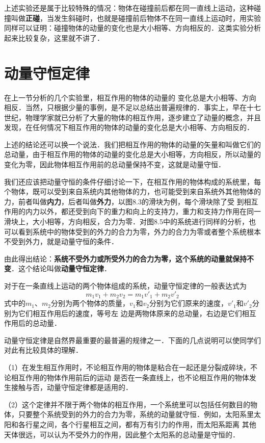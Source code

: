 上述实验还是属于比较特殊的情况：物体在碰撞前后都在同一直线上运动，这种碰撞叫做\textbf{正碰}，当发生斜碰时，也就是碰撞前后物体不在同一直线上运动时，用实验同样可以证明：碰撞物体的动量的变化也是大小相等、方向相反的．这类实验分析起来比较复杂，这里就不讲了．
\newpage
\section{动量守恒定律}
在上一节分析的几个实验里，相互作用的物体的动量的
变化总是大小相等、方向相反．当然，只根据少量的事例，是不足以总结出普遍规律的．事实上，早在十七世纪，物理学家就已分析了大量的物体的相互作用，逐步建立了动量的概念，并且发现，在任何情况下相互作用的物体的动量的变化总是大小相等、方向相反的．

上述的结论还可以换一个说法．我们把相互作用的物体的动量的矢量和叫做它们的总动量，由于相互作用的物体的动量的变化总是大小相等，方向相反，所以动量的变化为零，因此物体相互作用前的总动量保持不变，这就是动量守恒．

我们还应该把动量守恒的条件仔细讨论一下，在相互作用的物体构成的系统里，每个物体，既可以受到来自系统内其他物体的力，也可能受到来自系统外其他物体的力，前者叫做\textbf{内力}，后者叫做\textbf{外力}，以图8.3的滑块为例，每个滑块除了受
到相互作用的内力以外，都还受到向下的重力和向上的支持力，重力和支持力作用在同一滑块上，大小相等，方向相反，合力为零．对图8.5中的系统进行同样的分析，也可以看到系统中的物体受到的外力的合力为零，外力的合力为零或者整个系统根本不受到外力，就是动量守恒的条件．

由此得出结论：\textbf{系统不受外力或所受外力的合力为零，这个系统的动量就保持不变}．这个结论叫做\textbf{动量守恒定律}．

对于在一条直线上运动的两个物体组成的系统，动量守恒定律的一般表达式为
\[m_1v_1+m_2v_2=m_1v'_1+m_2v'_2 \]
式中的$m_1$、$m_2$分别为两个物体的质量，$v_1$和$v_2$分别为它们原来的速度，$v'_1$和$v'_2$分别为它们相互作用后的速度，等号左
边是两物体原来的总动量，右边是它们相互作用后的总动量．

动量守恒定律是自然界最重要的最普遍的规律之一．下面的几点说明可以使同学们对此有比较具体的理解．

（1）在发生相互作用时，不论相互作用的物体是粘合在一起还是分裂成碎块，不论相互作用的物体作用前后的运动
是否在一条直线上，也不论相互作用的物体发生接触与否，动量守恒定律都是适用的．

（2）这个定律并不限于两个物体的相互作用，一个系统里可以包括任何数目的物体，只要整个系统受到的外力的合力为零，系统的动量就守恒．例如，太阳系里太阳和各行星之间，各个行星相互之间，都有万有引力的作用，而太阳系距离
其他天体很远，可以认为不受外力的作用，因此整个太阳系的总动量是守恒的．

